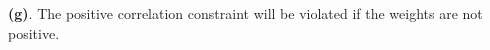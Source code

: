 \documentclass[11pt,letter]{article}
\begin{document}
\textbf{(g)}. The positive correlation constraint will be violated if the weights are not positive.



%
%
%
%
%
%
%
%
%
%
%
%
%
%
%
\end{document}

